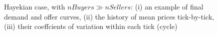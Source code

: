\documentclass[12pt]{report}
\begin{document}
\begin{appendices}
\begin{figure}[htbp]
\begin{center}
\caption{Hayekian case, with $nBuyers \gg nSellers$: (i) an example of final demand and offer curves, (ii) the history of mean prices tick-by-tick, (iii) their coeffcients of variation within each tick (cycle)}
\label{output_3_1a.png}
\end{center}
\end{figure}


\end{appendices}
\end{document}
